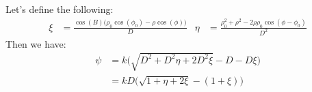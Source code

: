 \documentclass[crop=false,class=article,oneside]{standalone}
\begin{document}
            Let's define the following:
            \begin{align*}
                \xi&=\frac{\cos(B)\big(\rho_{0}\cos(\phi_{0})-
                           \rho\cos(\phi)\big)}
                          {D}
                &
                \eta&=\frac{\rho_{0}^2+\rho^2-
                            2\rho\rho_{0}\cos(\phi-\phi_{0})}
                           {D^2}
            \end{align*}
            Then we have:
            \begin{align*}
                \psi
                &=k\big(\sqrt{D^2+D^2\eta+2D^2\xi}-D-D\xi\big)\\
                &=kD\big(\sqrt{1+\eta+2\xi}-(1+\xi)\big)
            \end{align*}
\end{document}
